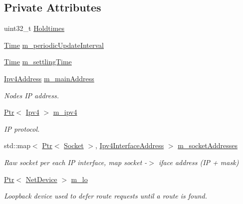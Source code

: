 \subsection*{Private Attributes}
\begin{DoxyCompactItemize}
\item 
uint32\+\_\+t \hyperlink{classns3_1_1dsdv_1_1RoutingProtocol_acdadd6be395f15827ec7c8531797b6e0}{Holdtimes}
\item 
\hyperlink{classns3_1_1Time}{Time} \hyperlink{classns3_1_1dsdv_1_1RoutingProtocol_a1951a29aaca9beebdff3abd5c7d00ef0}{m\+\_\+periodic\+Update\+Interval}
\item 
\hyperlink{classns3_1_1Time}{Time} \hyperlink{classns3_1_1dsdv_1_1RoutingProtocol_ac00a3214f64eddbab1fbf039aa293ae9}{m\+\_\+settling\+Time}
\item 
\hyperlink{classns3_1_1Ipv4Address}{Ipv4\+Address} \hyperlink{classns3_1_1dsdv_1_1RoutingProtocol_af7cb076b88eb5ff20a1c146e3f5849f6}{m\+\_\+main\+Address}
\begin{DoxyCompactList}\small\item\em Nodes IP address. \end{DoxyCompactList}\item 
\hyperlink{classns3_1_1Ptr}{Ptr}$<$ \hyperlink{classns3_1_1Ipv4}{Ipv4} $>$ \hyperlink{classns3_1_1dsdv_1_1RoutingProtocol_a955477c7f38e64762a264c24e3762af6}{m\+\_\+ipv4}
\begin{DoxyCompactList}\small\item\em IP protocol. \end{DoxyCompactList}\item 
std\+::map$<$ \hyperlink{classns3_1_1Ptr}{Ptr}$<$ \hyperlink{classns3_1_1Socket}{Socket} $>$, \hyperlink{classns3_1_1Ipv4InterfaceAddress}{Ipv4\+Interface\+Address} $>$ \hyperlink{classns3_1_1dsdv_1_1RoutingProtocol_a9f3be507604655079b145f063cf036fd}{m\+\_\+socket\+Addresses}
\begin{DoxyCompactList}\small\item\em Raw socket per each IP interface, map socket -\/$>$ iface address (IP + mask) \end{DoxyCompactList}\item 
\hyperlink{classns3_1_1Ptr}{Ptr}$<$ \hyperlink{classns3_1_1NetDevice}{Net\+Device} $>$ \hyperlink{classns3_1_1dsdv_1_1RoutingProtocol_a793deb930065a91d037ed2930e756528}{m\+\_\+lo}
\begin{DoxyCompactList}\small\item\em Loopback device used to defer route requests until a route is found. \end{DoxyCompactList}\item 

\end{DoxyCompactItemize}
